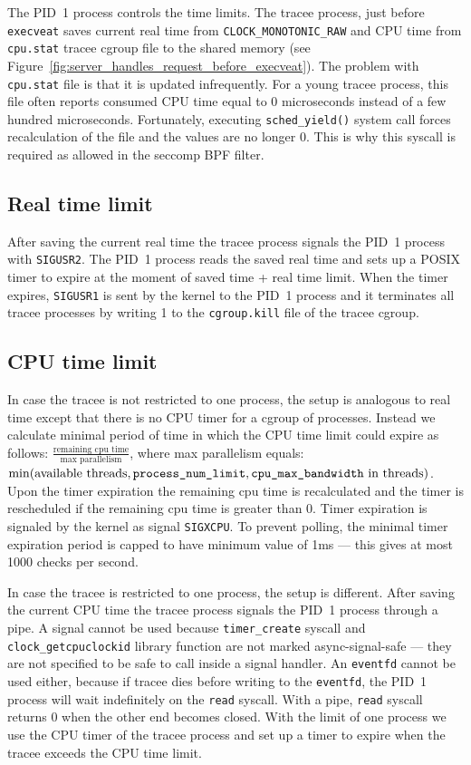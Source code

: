 \documentclass[en]{pracamgr}
\begin{document}
The PID~1 process controls the time limits. The tracee process, just before \texttt{execveat} saves current real time from \texttt{CLOCK\_MONOTONIC\_RAW} and CPU time from \texttt{cpu.stat} tracee cgroup file to the shared memory (see Figure~\ref{fig:server_handles_request_before_execveat}). The problem with \texttt{cpu.stat} file is that it is updated infrequently. For a young tracee process, this file often reports consumed CPU time equal to 0 microseconds instead of a few hundred microseconds. Fortunately, executing \texttt{sched\_yield()} system call forces recalculation of the file and the values are no longer 0. This is why this syscall is required as allowed in the seccomp BPF filter.

\subsection{Real time limit}

After saving the current real time the tracee process signals the PID~1 process with \texttt{SIGUSR2}. The PID~1 process reads the saved real time and sets up a POSIX timer to expire at the moment of saved time + real time limit. When the timer expires, \texttt{SIGUSR1} is sent by the kernel to the PID~1 process and it terminates all tracee processes by writing 1 to the \texttt{cgroup.kill} file of the tracee cgroup.

\subsection{CPU time limit}

In case the tracee is not restricted to one process, the setup is analogous to real time except that there is no CPU timer for a cgroup of processes. Instead we calculate minimal period of time in which the CPU time limit could expire as follows: $\frac{\text{remaining cpu time}}{\text{max parallelism}}$, where max parallelism equals: $\min(\text{available threads}, \text{\texttt{process\_num\_limit}}, \text{\texttt{cpu\_max\_bandwidth} in threads})$. Upon the timer expiration the remaining cpu time is recalculated and the timer is rescheduled if the remaining cpu time is greater than 0. Timer expiration is signaled by the kernel as signal \texttt{SIGXCPU}. To prevent polling, the minimal timer expiration period is capped to have minimum value of 1ms --- this gives at most 1000 checks per second.

In case the tracee is restricted to one process, the setup is different. After saving the current CPU time the tracee process signals the PID~1 process through a pipe. A signal cannot be used because \texttt{timer\_create} syscall and \texttt{clock\_getcpuclockid} library function are not marked async-signal-safe --- they are not specified to be safe to call inside a signal handler. An \texttt{eventfd} cannot be used either, because if tracee dies before writing to the \texttt{eventfd}, the PID~1 process will wait indefinitely on the \texttt{read} syscall. With a pipe, \texttt{read} syscall returns 0 when the other end becomes closed. With the limit of one process we use the CPU timer of the tracee process and set up a timer to expire when the tracee exceeds the CPU time limit.
\end{document}
